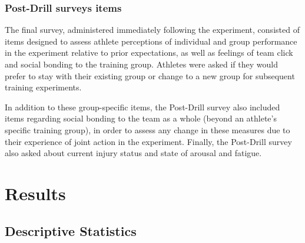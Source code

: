 \subsubsection{Post-Drill surveys items\label{app9:surveyItemsPost}}
The final survey, administered immediately following the experiment, consisted of items designed to assess athlete perceptions of individual and group performance in the experiment relative to prior expectations, as well as feelings of team click and social bonding to the training group.  Athletes were asked if they would prefer to stay with their existing group or change to a new group for subsequent training experiments.

In addition to these group-specific items, the Post-Drill survey also included items regarding social bonding to the team as a whole (beyond an athlete's specific training group), in order to assess any change in these measures due to their experience of joint action in the experiment.  Finally, the Post-Drill survey also asked about current injury status and state of arousal and fatigue.



\section{\label{app9:results}Results}

\subsection{Descriptive Statistics\label{app9:descriptives}}




%
%
%
%
%
%
%
%
%
%
%
%

